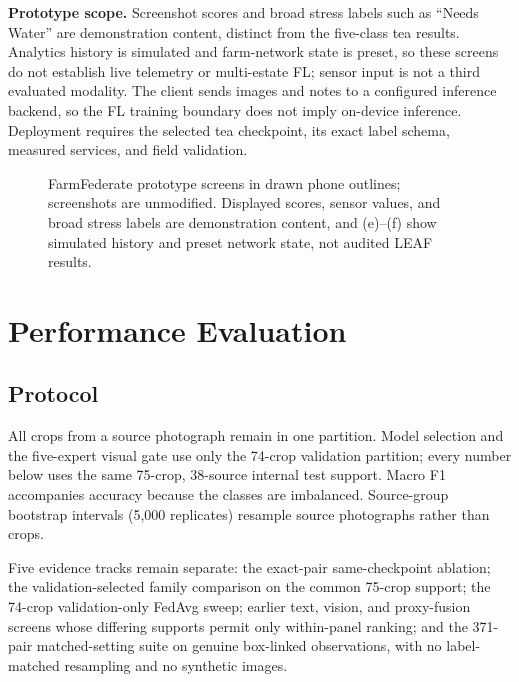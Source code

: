 \documentclass[conference]{IEEEtran}
\begin{document}
\textbf{Prototype scope.} Screenshot scores and broad stress labels such as
``Needs Water'' are demonstration content, distinct from the five-class tea
results. Analytics history is simulated and farm-network state is preset, so
these screens do not establish live telemetry or multi-estate FL; sensor input
is not a third evaluated modality. The client sends images and notes to a
configured inference backend, so the FL training boundary does not imply
on-device inference. Deployment requires the selected tea checkpoint, its
exact label schema, measured services, and field validation.

\begin{figure}[t]
\centering

\caption{FarmFederate prototype screens in drawn phone outlines; screenshots
are unmodified. Displayed scores, sensor values, and broad stress labels are
demonstration content, and (e)--(f) show simulated history and preset network
state, not audited LEAF results.}
\label{fig:app_screens}
\end{figure}


\section{Performance Evaluation}
\label{sec:eval}

\subsection{Protocol}

All crops from a source photograph remain in one partition. Model selection and
the five-expert visual gate use only the 74-crop validation partition; every
number below uses the same 75-crop, 38-source internal test support. Macro F1
accompanies accuracy because the classes are imbalanced. Source-group bootstrap
intervals (5,000 replicates) resample source photographs rather than crops.

Five evidence tracks remain separate: the exact-pair same-checkpoint ablation;
the validation-selected family comparison on the common 75-crop support; the
74-crop validation-only FedAvg sweep; earlier text, vision, and proxy-fusion
screens whose differing supports permit only within-panel ranking; and the
371-pair matched-setting suite on genuine box-linked observations, with no
label-matched resampling and no synthetic images.
\end{document}

